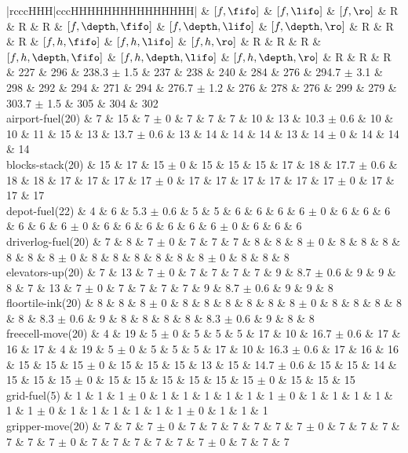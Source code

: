 \begin{center}
\begin{tabular}{|rcccHHH|cccHHHHHHHHHHHHHHH|}
 & \([f,\fifo]\) & \([f,\lifo]\) & \([f,\ro]\) & R & R & R & \([f,\depth,\fifo]\) & \([f,\depth,\lifo]\) & \([f,\depth,\ro]\) & R & R & R & \([f,h,\fifo]\) & \([f,h,\lifo]\) & \([f,h,\ro]\) & R & R & R & \([f,h,\depth,\fifo]\) & \([f,h,\depth,\lifo]\) & \([f,h,\depth,\ro]\) & R & R & R\\
\hline
 & 227 & 296 & 238.3 \(\pm\) 1.5 & 237 & 238 & 240 & 284 & 276 & 294.7 \(\pm\) 3.1 & 298 & 292 & 294 & 271 & 294 & 276.7 \(\pm\) 1.2 & 276 & 278 & 276 & 299 & 279 & 303.7 \(\pm\) 1.5 & 305 & 304 & 302\\
\hline
airport-fuel(20) & 7 & 15 & 7 \(\pm\) 0 & 7 & 7 & 7 & 10 & 13 & 10.3 \(\pm\) 0.6 & 10 & 10 & 11 & 15 & 13 & 13.7 \(\pm\) 0.6 & 13 & 14 & 14 & 14 & 13 & 14 \(\pm\) 0 & 14 & 14 & 14\\
blocks-stack(20) & 15 & 17 & 15 \(\pm\) 0 & 15 & 15 & 15 & 17 & 18 & 17.7 \(\pm\) 0.6 & 18 & 18 & 17 & 17 & 17 & 17 \(\pm\) 0 & 17 & 17 & 17 & 17 & 17 & 17 \(\pm\) 0 & 17 & 17 & 17\\
depot-fuel(22) & 4 & 6 & 5.3 \(\pm\) 0.6 & 5 & 5 & 6 & 6 & 6 & 6 \(\pm\) 0 & 6 & 6 & 6 & 6 & 6 & 6 \(\pm\) 0 & 6 & 6 & 6 & 6 & 6 & 6 \(\pm\) 0 & 6 & 6 & 6\\
driverlog-fuel(20) & 7 & 8 & 7 \(\pm\) 0 & 7 & 7 & 7 & 8 & 8 & 8 \(\pm\) 0 & 8 & 8 & 8 & 8 & 8 & 8 \(\pm\) 0 & 8 & 8 & 8 & 8 & 8 & 8 \(\pm\) 0 & 8 & 8 & 8\\
elevators-up(20) & 7 & 13 & 7 \(\pm\) 0 & 7 & 7 & 7 & 7 & 9 & 8.7 \(\pm\) 0.6 & 9 & 9 & 8 & 7 & 13 & 7 \(\pm\) 0 & 7 & 7 & 7 & 7 & 9 & 8.7 \(\pm\) 0.6 & 9 & 9 & 8\\
floortile-ink(20) & 8 & 8 & 8 \(\pm\) 0 & 8 & 8 & 8 & 8 & 8 & 8 \(\pm\) 0 & 8 & 8 & 8 & 8 & 8 & 8.3 \(\pm\) 0.6 & 9 & 8 & 8 & 8 & 8 & 8.3 \(\pm\) 0.6 & 9 & 8 & 8\\
freecell-move(20) & 4 & 19 & 5 \(\pm\) 0 & 5 & 5 & 5 & 17 & 10 & 16.7 \(\pm\) 0.6 & 17 & 16 & 17 & 4 & 19 & 5 \(\pm\) 0 & 5 & 5 & 5 & 17 & 10 & 16.3 \(\pm\) 0.6 & 17 & 16 & 16\\
 & 15 & 15 & 15 \(\pm\) 0 & 15 & 15 & 15 & 13 & 15 & 14.7 \(\pm\) 0.6 & 15 & 15 & 14 & 15 & 15 & 15 \(\pm\) 0 & 15 & 15 & 15 & 15 & 15 & 15 \(\pm\) 0 & 15 & 15 & 15\\
grid-fuel(5) & 1 & 1 & 1 \(\pm\) 0 & 1 & 1 & 1 & 1 & 1 & 1 \(\pm\) 0 & 1 & 1 & 1 & 1 & 1 & 1 \(\pm\) 0 & 1 & 1 & 1 & 1 & 1 & 1 \(\pm\) 0 & 1 & 1 & 1\\
gripper-move(20) & 7 & 7 & 7 \(\pm\) 0 & 7 & 7 & 7 & 7 & 7 & 7 \(\pm\) 0 & 7 & 7 & 7 & 7 & 7 & 7 \(\pm\) 0 & 7 & 7 & 7 & 7 & 7 & 7 \(\pm\) 0 & 7 & 7 & 7\\

\end{tabular}
\end{center}

